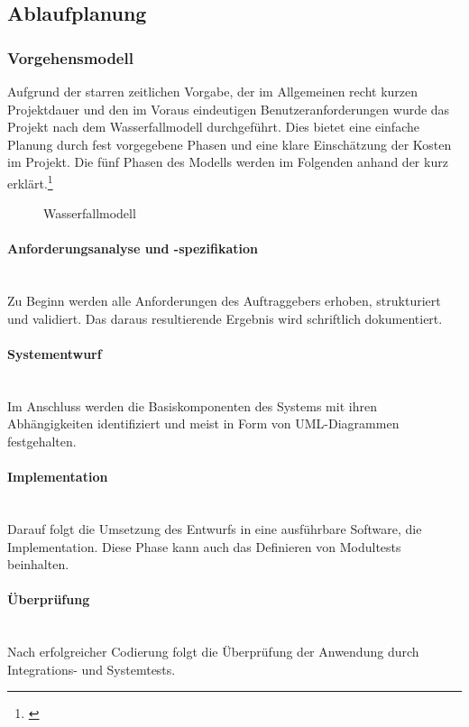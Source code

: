 \subsection{Ablaufplanung}\label{sec:Ablaufplanung}

\subsubsection{Vorgehensmodell}\label{sec:Vorgehensmodell}
Aufgrund der starren zeitlichen Vorgabe, der im Allgemeinen recht kurzen Projektdauer und den im Voraus eindeutigen Benutzeranforderungen wurde das Projekt nach dem Wasserfallmodell durchgeführt. Dies bietet eine einfache Planung durch fest vorgegebene Phasen und eine klare Einschätzung der Kosten im Projekt. Die fünf Phasen des Modells werden im Folgenden anhand der  kurz erklärt.\footnote{\cite{wiki:waterfall}} 
\begin{figure}[htb]
	\centering
	\caption{Wasserfallmodell}
	\label{fig:Waterfall}
\end{figure}

\paragraph{Anforderungsanalyse und -spezifikation}~\\\label{p:Anforderungsanalyse}
Zu Beginn werden alle Anforderungen des Auftraggebers erhoben, strukturiert und validiert. Das daraus resultierende Ergebnis wird schriftlich dokumentiert.

\paragraph{Systementwurf}~\\\label{p:Systementwurf}
Im Anschluss werden die Basiskomponenten des Systems mit ihren Abhängigkeiten identifiziert und meist in Form von UML-Diagrammen festgehalten.

\paragraph{Implementation}~\\\label{p:Implementation}
Darauf folgt die Umsetzung des Entwurfs in eine ausführbare Software, die Implementation. Diese Phase kann auch das Definieren von Modultests beinhalten.

\paragraph{Überprüfung}~\\\label{p:Ueberpruefung}
Nach erfolgreicher Codierung folgt die Überprüfung der Anwendung durch Integrations- und Systemtests.

